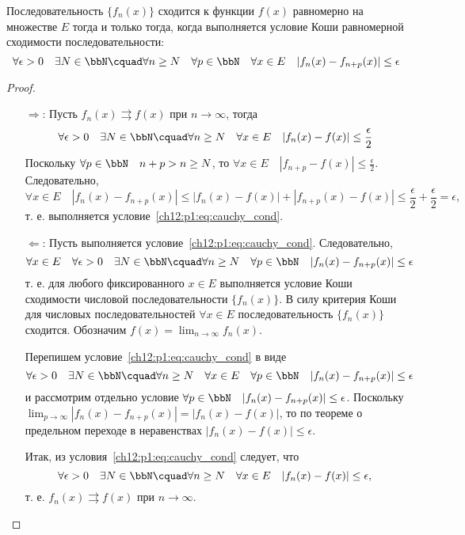 \begin{thm}
	\label{ch12:th:cauchy_criteria}
	Последовательность $\{f_n(x)\}$ сходится к функции $f(x)$ равномерно на множестве $E$
	тогда и только тогда, когда выполняется условие Коши равномерной сходимости последовательности:
	\begin{equation}
		\label{ch12:p1:eq:cauchy_cond}
		\forall \epsilon > 0 \quad \exists N \in \bbN \cquad
			\forall n \ge N \quad \forall p \in \bbN \quad \forall x \in E \quad
			|f_n(x) - f_{n+p}(x)| \le \epsilon
	\end{equation}
\end{thm}
\begin{proof}\leavevmode
\begin{itemize}[wide, labelwidth=!, labelindent=0pt]
	\item[$\Longrightarrow$:]
	Пусть $f_n(x) \rightrightarrows f(x)$ при $n \to \infty$, тогда 
	$$
		\forall \epsilon > 0 \quad \exists N \in \bbN \cquad
			\forall n \ge N \quad \forall x \in E \quad |f_n(x) - f(x)| \le \frac{\epsilon}{2}
	$$
	Поскольку $\forall p \in \bbN \quad n + p > n \ge N$, то
	$\forall x \in E \quad |f_{n+p} - f(x)| \le \frac{\epsilon}{2}$.\\
	Следовательно,
	$$
		\forall x \in E \quad |f_n(x) - f_{n+p}(x)| \le |f_n(x) - f(x)| + |f_{n+p}(x) - f(x)| \le
			\frac{\epsilon}{2} + \frac{\epsilon}{2} = \epsilon,
	$$
	т. е. выполняется условие~\eqref{ch12:p1:eq:cauchy_cond}.

	\item[$\Longleftarrow$:]
	Пусть выполняется условие~\eqref{ch12:p1:eq:cauchy_cond}. Следовательно,
	$$
		\forall x \in E \quad \forall \epsilon > 0 \quad \exists N \in \bbN \cquad
			\forall n \ge N \quad \forall p \in \bbN \quad
			|f_n(x) - f_{n+p}(x)| \le \epsilon
	$$
	т. е. для любого фиксированного $x \in E$ выполняется условие Коши сходимости
	числовой последовательности $\{f_n(x)\}$. В силу критерия Коши для числовых
	последовательностей $\forall x \in E$ последовательность $\{f_n(x)\}$ сходится.
	Обозначим $f(x) = \lim_{n \to \infty}\limits f_n(x)$.

	Перепишем условие~\eqref{ch12:p1:eq:cauchy_cond} в виде
	$$
		\forall \epsilon > 0 \quad \exists N \in \bbN \cquad
			\forall n \ge N \quad \forall x \in E \quad \forall p \in \bbN \quad 
			|f_n(x) - f_{n+p}(x)| \le \epsilon
	$$
	и рассмотрим отдельно условие $\forall p \in \bbN \quad |f_n(x) - f_{n+p}(x)| \le \epsilon$.
	Поскольку $\lim_{p \to \infty}\limits |f_n(x) - f_{n+p}(x)| = |f_n(x) - f(x)|$, то
	по теореме о предельном переходе в неравенствах $|f_n(x) - f(x)| \le \epsilon$.

	Итак, из условия~\eqref{ch12:p1:eq:cauchy_cond} следует, что
	$$
		\forall \epsilon > 0 \quad \exists N \in \bbN \cquad
			\forall n \ge N \quad \forall x \in E \quad |f_n(x) - f(x)| \le \epsilon,
	$$
	т. е. $f_n(x) \rightrightarrows f(x)$ при $n \to \infty$.
\end{itemize}
\end{proof}



